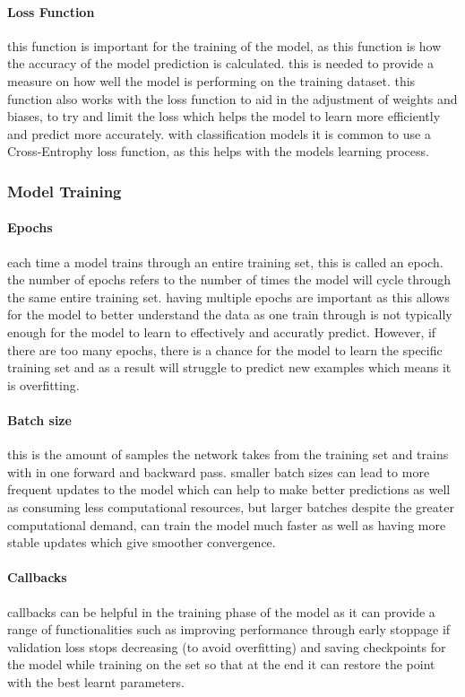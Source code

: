 \documentclass[]{final_report}
\begin{document}
\paragraph{Loss Function}
this function is important for the training of the model, as this function is how the accuracy of the model prediction is calculated. this is needed to provide a measure on how well the model is performing on the training dataset. this function also works with the loss function to aid in the adjustment of weights and biases, to try and limit the loss which helps the model to learn more efficiently and predict more accurately. with classification models it is common to use a Cross-Entrophy loss function, as this helps with the models learning process.

\subsubsection{Model Training}

\paragraph{Epochs}
each time a model trains through an entire training set, this is called an epoch. the number of epochs refers to the number of times the model will cycle through the same entire training set. having multiple epochs are important as this allows for the model to better understand the data as one train through is not typically enough for the model to learn to effectively and accuratly predict. However, if there are too many epochs, there is a chance for the model to learn the specific training set and as a result will struggle to predict new examples which means it is overfitting.

\paragraph{Batch size}
this is the amount of samples the network takes from the training set and trains with in one forward and backward pass. smaller batch sizes can lead to more frequent updates to the model which can help to make better predictions as well as consuming less computational resources, but larger batches despite the greater computational demand, can train the model much faster as well as having more stable updates which give smoother convergence.

\paragraph{Callbacks}
callbacks can be helpful in the training phase of the model as it can provide a range of functionalities such as improving performance through early stoppage if validation loss stops decreasing (to avoid overfitting) and saving checkpoints for the model while training on the set so that at the end it can restore the point with the best learnt parameters.
\end{document}
